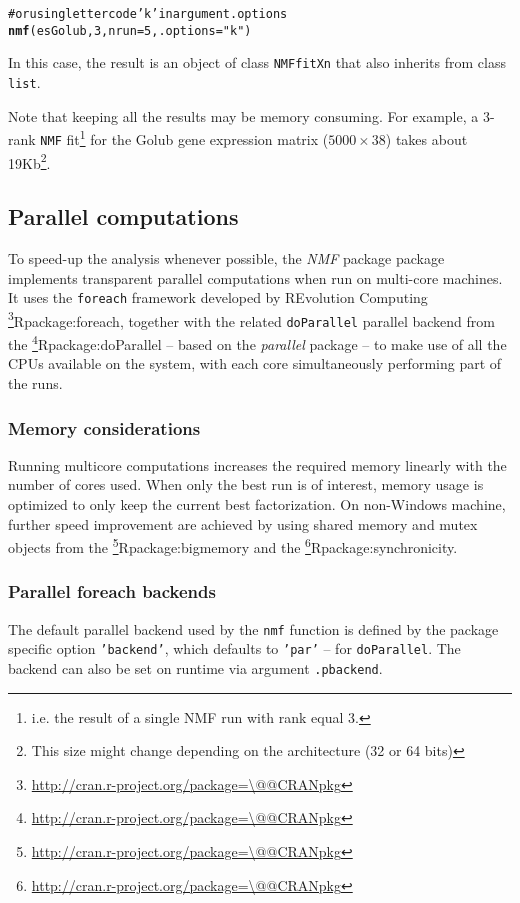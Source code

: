 \documentclass[a4paper]{article}\usepackage{graphicx, color}
\makeatletter
\newcommand{\hlfunctioncall}[1]{\textcolor[rgb]{0.501960784313725,0,0.329411764705882}{\textbf{#1}}}%
\newcommand{\hlstring}[1]{\textcolor[rgb]{0.6,0.6,1}{#1}}%
\newcommand{\hlcomment}[1]{\textcolor[rgb]{0.180392156862745,0.6,0.341176470588235}{#1}}%
\newenvironment{kframe}{%
 \def\at@end@of@kframe{}%
 \ifinner\ifhmode%
  \def\at@end@of@kframe{\end{minipage}}%
  \begin{minipage}{\columnwidth}%
 \fi\fi%
 \def\FrameCommand##1{\hskip\@totalleftmargin \hskip-\fboxsep
 \colorbox{shadecolor}{##1}\hskip-\fboxsep
     \hskip-\linewidth \hskip-\@totalleftmargin \hskip\columnwidth}%
 \MakeFramed {\advance\hsize-\width
   \@totalleftmargin\z@ \linewidth\hsize
   \@setminipage}}%
 {\par\unskip\endMakeFramed%
 \at@end@of@kframe}
\newenvironment{knitrout}{}{} %
\let\code=\texttt
\newcommand{\pkgname}[1]{\textit{#1}\xspace}
\newcommand{\Rpkg}[1]{\pkgname{#1} package\xspace}
\newcommand{\CRANurl}[1]{\url{http://cran.r-project.org/package=#1}}
\def\CRANpkg{\@ifstar\@CRANpkg\@@CRANpkg}
\def\@CRANpkg#1{\href{http://cran.r-project.org/package=#1}{\pkgname{#1}}\footnote{\CRANurl{#1}}}
\def\@@CRANpkg#1{\href{http://cran.r-project.org/package=#1}{\pkgname{#1}} package\footnote{\CRANurl{#1}}}
\def\citeCRANpkg{\@ifstar\@citeCRANpkg\@@citeCRANpkg}
\def\@citeCRANpkg#1{\CRANpkg{#1}\cite*{Rpackage:#1}}
\def\@@citeCRANpkg#1{\CRANpkg{#1}~\cite{Rpackage:#1}}
\newcommand{\nmfpack}{\Rpkg{NMF}}
\renewcommand{\cite}[1]{\parencite{#1}}
\makeatother
\begin{document}
\begin{knitrout}
\color{fgcolor}\begin{kframe}
\begin{alltt}
\hlcomment{# or using letter code 'k' in argument .options}
\hlfunctioncall{nmf}(esGolub, 3, nrun = 5, .options = \hlstring{"k"})
\end{alltt}
\end{kframe}
\end{knitrout}


In this case, the result is an object of class \code{NMFfitXn} that also inherits from class \code{list}.

Note that keeping all the results may be memory consuming. 
For example, a 3-rank \code{NMF} fit\footnote{i.e. the result of a single NMF run with rank equal 3.} for the Golub gene expression matrix ($5000 \times 38$) takes about 19Kb\footnote{This size might change depending on the architecture (32 or 64 bits)}.

\subsection{Parallel computations}\label{multicore}

To speed-up the analysis whenever possible, the \nmfpack package implements transparent parallel computations when run on multi-core machines.
It uses the \code{foreach} framework developed by REvolution Computing
\citeCRANpkg{foreach}, together with the related \code{doParallel} parallel
backend from the \citeCRANpkg{doParallel} -- based on the
\pkgname{parallel} package -- to make use of all the CPUs available on the
system, with each core simultaneously performing part of the runs. 

\subsubsection{Memory considerations}
Running multicore computations increases the required memory linearly
with the number of cores used.
When only the best run is of interest, memory usage is
optimized to only keep the current best factorization.
On non-Windows machine, further speed improvement are achieved by using shared
memory and mutex objects from the \citeCRANpkg{bigmemory} and the 
\citeCRANpkg{synchronicity}.

\subsubsection{Parallel foreach backends}
The default parallel backend used by the \code{nmf} function is defined by the
package specific option \code{'backend'}, which defaults to \code{'par'} -- for
\code{doParallel}.
The backend can also be set on runtime via argument \code{.pbackend}.
\end{document}
